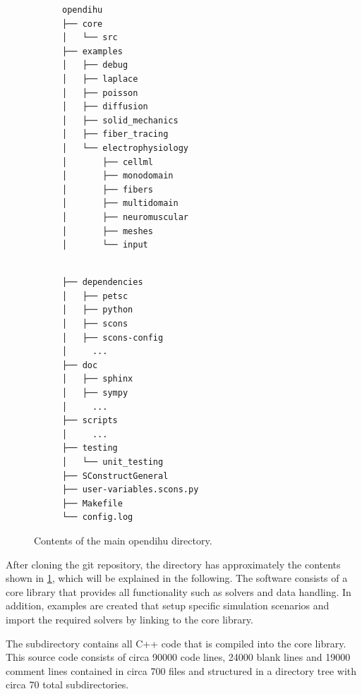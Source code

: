 \begin{figure}
\centering

\begin{framed}
\begin{subfigure}[t]{0.45\textwidth}%
\begin{Verbatim}[fontsize=\small]
opendihu
├── core
│   └── src
├── examples
│   ├── debug
│   ├── laplace
│   ├── poisson
│   ├── diffusion
│   ├── solid_mechanics
│   ├── fiber_tracing
│   └── electrophysiology
│       ├── cellml
│       ├── monodomain
│       ├── fibers
│       ├── multidomain
│       ├── neuromuscular
│       ├── meshes
│       └── input

\end{Verbatim}
\end{subfigure}
\begin{subfigure}[t]{0.45\textwidth}%
\begin{Verbatim}[fontsize=\small]

├── dependencies
│   ├── petsc
│   ├── python
│   ├── scons
│   ├── scons-config
│     ...
├── doc
│   ├── sphinx
│   ├── sympy
│     ...
├── scripts
│     ...
├── testing
│   └── unit_testing
├── SConstructGeneral
├── user-variables.scons.py
├── Makefile
└── config.log
\end{Verbatim}
\end{subfigure}
\end{framed}
\caption{Contents of the main opendihu directory.}%
\label{fig:directory_structure}%
\end{figure}

After cloning the git repository, the directory has approximately the contents shown in \cref{fig:directory_structure}, which will be explained in the following.
The software consists of a core library that provides all functionality such as solvers and data handling. In addition, examples are created that setup specific simulation scenarios and import the required solvers by linking to the core library. 

The subdirectory  contains all C++ code that is compiled into the core library. This source code consists of circa \num{90000} code lines, \num{24000} blank lines and \num{19000} comment lines contained in circa 700 files and structured in a directory tree with circa 70 total subdirectories.

